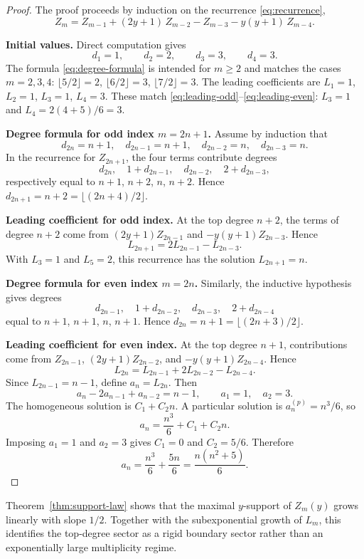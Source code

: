\begin{proof}
The proof proceeds by induction on the recurrence \eqref{eq:recurrence},
\[
Z_m = Z_{m-1} + (2y+1)\,Z_{m-2} - Z_{m-3} - y(y+1)\,Z_{m-4}.
\]

\noindent\textbf{Initial values.}
Direct computation gives
\[
d_1 = 1, \qquad d_2 = 2, \qquad d_3 = 3, \qquad d_4 = 3.
\]
The formula \eqref{eq:degree-formula} is intended for $m \ge 2$ and matches the cases $m=2,3,4$:
$\lfloor 5/2 \rfloor = 2$, $\lfloor 6/2 \rfloor = 3$, $\lfloor 7/2 \rfloor = 3$.
The leading coefficients are $L_1 = 1$, $L_2 = 1$, $L_3 = 1$, $L_4 = 3$.
These match \eqref{eq:leading-odd}--\eqref{eq:leading-even}: $L_3 = 1$ and $L_4 = 2(4+5)/6 = 3$.

\medskip
\noindent\textbf{Degree formula for odd index $m = 2n+1$.}
Assume by induction that
\[
d_{2n} = n+1, \quad d_{2n-1} = n+1, \quad d_{2n-2} = n, \quad d_{2n-3} = n.
\]
In the recurrence for $Z_{2n+1}$, the four terms contribute degrees
\[
d_{2n},\quad 1 + d_{2n-1},\quad d_{2n-2},\quad 2 + d_{2n-3},
\]
respectively equal to $n+1$, $n+2$, $n$, $n+2$.
Hence $d_{2n+1} = n + 2 = \lfloor (2n+4)/2 \rfloor$.

\medskip
\noindent\textbf{Leading coefficient for odd index.}
At the top degree $n+2$, the terms of degree $n+2$ come from $(2y+1)Z_{2n-1}$ and $-y(y+1)Z_{2n-3}$.
Hence
\begin{equation}\label{eq:L-odd-recurrence}
L_{2n+1} = 2L_{2n-1} - L_{2n-3}.
\end{equation}
With $L_3 = 1$ and $L_5 = 2$, this recurrence has the solution $L_{2n+1} = n$.

\medskip
\noindent\textbf{Degree formula for even index $m = 2n$.}
Similarly, the inductive hypothesis gives degrees
\[
d_{2n-1},\quad 1 + d_{2n-2},\quad d_{2n-3},\quad 2 + d_{2n-4}
\]
equal to $n+1$, $n+1$, $n$, $n+1$.
Hence $d_{2n} = n+1 = \lfloor(2n+3)/2\rfloor$.

\medskip
\noindent\textbf{Leading coefficient for even index.}
At the top degree $n+1$, contributions come from $Z_{2n-1}$, $(2y+1)Z_{2n-2}$, and $-y(y+1)Z_{2n-4}$.
Hence
\begin{equation}\label{eq:L-even-recurrence}
L_{2n} = L_{2n-1} + 2L_{2n-2} - L_{2n-4}.
\end{equation}
Since $L_{2n-1}=n-1$, define $a_n = L_{2n}$.
Then
\begin{equation}\label{eq:a-recurrence}
a_n - 2a_{n-1} + a_{n-2} = n - 1,
\qquad a_1 = 1, \quad a_2 = 3.
\end{equation}
The homogeneous solution is $C_1 + C_2 n$.
A particular solution is $a_n^{(p)} = n^3/6$, so
\[
a_n = \frac{n^3}{6} + C_1 + C_2 n.
\]
Imposing $a_1 = 1$ and $a_2 = 3$ gives $C_1 = 0$ and $C_2 = 5/6$.
Therefore
\[
a_n = \frac{n^3}{6} + \frac{5n}{6} = \frac{n(n^2 + 5)}{6}.
\]
\end{proof}

\begin{remark}\label{rem:hard-support}
Theorem~\ref{thm:support-law} shows that the maximal \(y\)-support of \(Z_m(y)\) grows linearly with slope \(1/2\).
Together with the subexponential growth of \(L_m\), this identifies the top-degree sector as a rigid boundary sector rather than an exponentially large multiplicity regime.
\end{remark}
